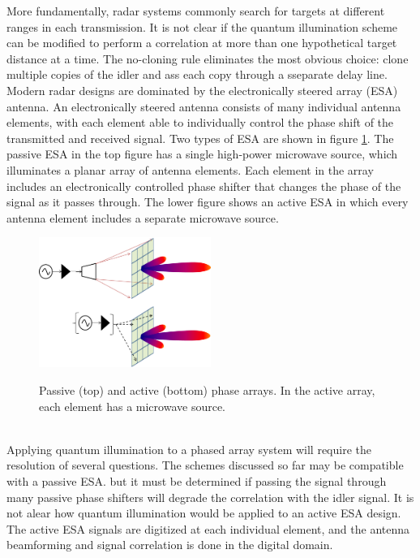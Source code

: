\documentclass[a4paper,11pt, twocolumn]{article}
\numberwithin{equation}{section}
\begin{document}
More fundamentally, radar systems commonly search for targets at different ranges in each transmission. 
It is not clear if the quantum illumination scheme can be modified to perform a correlation at more than one hypothetical target distance at a time.
The no-cloning rule eliminates the most obvious choice: clone multiple copies of the idler and ass each copy through a sseparate delay line.
\\
Modern radar designs are dominated by the electronically steered array (ESA) antenna. 
An electronically steered antenna consists of many individual antenna elements, with each element able to individually control the phase shift of the transmitted and received signal.
Two types of ESA are shown in figure \ref{fig:phasedarrays}. The passive ESA in the top figure has a single high-power microwave source, which illuminates a planar array of antenna elements.
Each element in the array includes an electronically controlled phase shifter that changes the phase of the signal as it passes through.
The lower figure shows an active ESA in which every antenna element includes a separate microwave source.
\begin{figure}
 \caption{Passive (top) and active (bottom) phase arrays. In the active array, each element has a microwave source.}
 \centering
   \includegraphics[width=0.5\textwidth]{figs/PhasedArrays}
 \label{fig:phasedarrays}
\end{figure}
\\
Applying quantum illumination to a phased array system will require the resolution of several questions.
The schemes discussed so far may be compatible with a passive ESA. but it must be determined if passing the signal through many passive phase shifters will degrade the correlation with the idler signal.
It is not alear how quantum illumination would be applied to an active ESA design. The active ESA signals are digitized at each individual element, and the antenna beamforming and signal correlation is done in the digital domain.

\printbibliography
\end{document}
